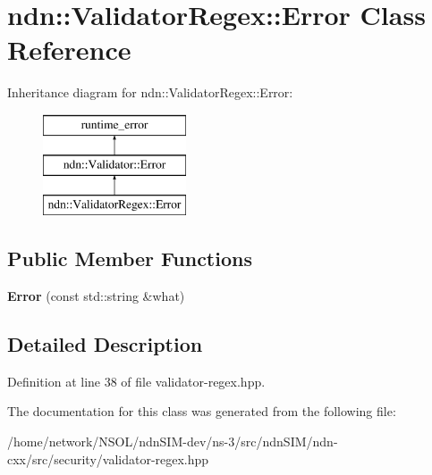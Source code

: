 \hypertarget{classndn_1_1ValidatorRegex_1_1Error}{}\section{ndn\+:\+:Validator\+Regex\+:\+:Error Class Reference}
\label{classndn_1_1ValidatorRegex_1_1Error}
Inheritance diagram for ndn\+:\+:Validator\+Regex\+:\+:Error\+:\begin{figure}[H]
\begin{center}
\leavevmode
\includegraphics[height=3.000000cm]{classndn_1_1ValidatorRegex_1_1Error}
\end{center}
\end{figure}
\subsection*{Public Member Functions}
\begin{DoxyCompactItemize}
\item 
{\bfseries Error} (const std\+::string \&what)\hypertarget{classndn_1_1ValidatorRegex_1_1Error_af2709a6053a5c0ec8f6b4b750b3ee964}{}\label{classndn_1_1ValidatorRegex_1_1Error_af2709a6053a5c0ec8f6b4b750b3ee964}

\end{DoxyCompactItemize}


\subsection{Detailed Description}


Definition at line 38 of file validator-\/regex.\+hpp.



The documentation for this class was generated from the following file\+:\begin{DoxyCompactItemize}
\item 
/home/network/\+N\+S\+O\+L/ndn\+S\+I\+M-\/dev/ns-\/3/src/ndn\+S\+I\+M/ndn-\/cxx/src/security/validator-\/regex.\+hpp\end{DoxyCompactItemize}

